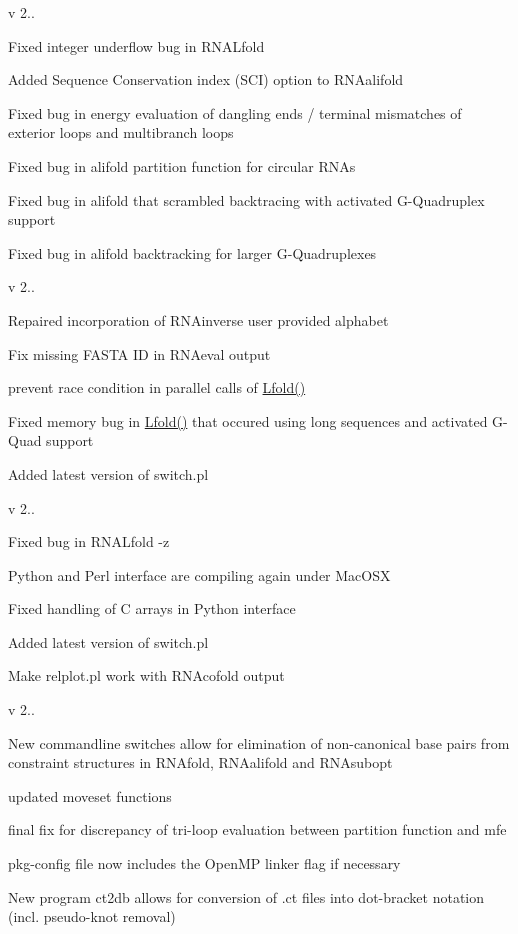 v 2..
\begin{DoxyItemize}
\item Fixed integer underflow bug in R\+N\+A\+Lfold
\item Added Sequence Conservation index (S\+CI) option to R\+N\+Aalifold
\item Fixed bug in energy evaluation of dangling ends / terminal mismatches of exterior loops and multibranch loops
\item Fixed bug in alifold partition function for circular R\+N\+As
\item Fixed bug in alifold that scrambled backtracing with activated G-\/\+Quadruplex support
\item Fixed bug in alifold backtracking for larger G-\/\+Quadruplexes
\end{DoxyItemize}

v 2..
\begin{DoxyItemize}
\item Repaired incorporation of R\+N\+Ainverse user provided alphabet
\item Fix missing F\+A\+S\+TA ID in R\+N\+Aeval output
\item prevent race condition in parallel calls of \mbox{\hyperlink{group__local__mfe__fold_ga16e5a70e60835bb969eaecbe6482f1be}{Lfold()}}
\item Fixed memory bug in \mbox{\hyperlink{group__local__mfe__fold_ga16e5a70e60835bb969eaecbe6482f1be}{Lfold()}} that occured using long sequences and activated G-\/\+Quad support
\item Added latest version of switch.\+pl
\end{DoxyItemize}

v 2..
\begin{DoxyItemize}
\item Fixed bug in R\+N\+A\+Lfold -\/z
\item Python and Perl interface are compiling again under Mac\+O\+SX
\item Fixed handling of C arrays in Python interface
\item Added latest version of switch.\+pl
\item Make relplot.\+pl work with R\+N\+Acofold output
\end{DoxyItemize}

v 2..
\begin{DoxyItemize}
\item New commandline switches allow for elimination of non-\/canonical base pairs from constraint structures in R\+N\+Afold, R\+N\+Aalifold and R\+N\+Asubopt
\item updated moveset functions
\item final fix for discrepancy of tri-\/loop evaluation between partition function and mfe
\item pkg-\/config file now includes the Open\+MP linker flag if necessary
\item New program ct2db allows for conversion of .ct files into dot-\/bracket notation (incl. pseudo-\/knot removal)
\end{DoxyItemize}

